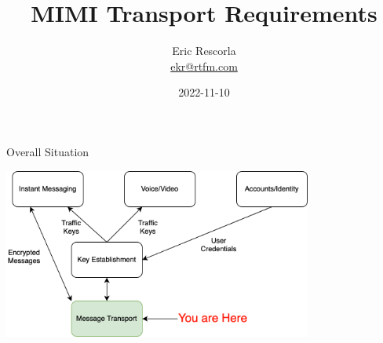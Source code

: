 \documentclass[helvetica]{beamer}
\title{MIMI Transport Requirements}
\author{Eric Rescorla \\\url{ekr@rtfm.com}}
\date{2022-11-10}
\begin{document}
\begin{frame}
  \titlepage
\end{frame}

\begin{frame}{Overall Situation}

  \vspace{.2in}
\begin{center}
  \includegraphics[width=4in]{messaging-architecture}
\end{center}
\end{frame}
\end{document}
